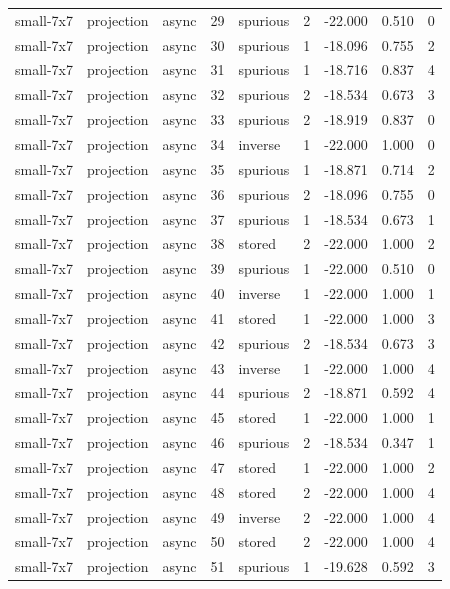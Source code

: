 \begin{tabular}{lllrlrrrr}
small-7x7 & projection & async & 29 & spurious & 2 & -22.000 & 0.510 & 0 \\
small-7x7 & projection & async & 30 & spurious & 1 & -18.096 & 0.755 & 2 \\
small-7x7 & projection & async & 31 & spurious & 1 & -18.716 & 0.837 & 4 \\
small-7x7 & projection & async & 32 & spurious & 2 & -18.534 & 0.673 & 3 \\
small-7x7 & projection & async & 33 & spurious & 2 & -18.919 & 0.837 & 0 \\
small-7x7 & projection & async & 34 & inverse & 1 & -22.000 & 1.000 & 0 \\
small-7x7 & projection & async & 35 & spurious & 1 & -18.871 & 0.714 & 2 \\
small-7x7 & projection & async & 36 & spurious & 2 & -18.096 & 0.755 & 0 \\
small-7x7 & projection & async & 37 & spurious & 1 & -18.534 & 0.673 & 1 \\
small-7x7 & projection & async & 38 & stored & 2 & -22.000 & 1.000 & 2 \\
small-7x7 & projection & async & 39 & spurious & 1 & -22.000 & 0.510 & 0 \\
small-7x7 & projection & async & 40 & inverse & 1 & -22.000 & 1.000 & 1 \\
small-7x7 & projection & async & 41 & stored & 1 & -22.000 & 1.000 & 3 \\
small-7x7 & projection & async & 42 & spurious & 2 & -18.534 & 0.673 & 3 \\
small-7x7 & projection & async & 43 & inverse & 1 & -22.000 & 1.000 & 4 \\
small-7x7 & projection & async & 44 & spurious & 2 & -18.871 & 0.592 & 4 \\
small-7x7 & projection & async & 45 & stored & 1 & -22.000 & 1.000 & 1 \\
small-7x7 & projection & async & 46 & spurious & 2 & -18.534 & 0.347 & 1 \\
small-7x7 & projection & async & 47 & stored & 1 & -22.000 & 1.000 & 2 \\
small-7x7 & projection & async & 48 & stored & 2 & -22.000 & 1.000 & 4 \\
small-7x7 & projection & async & 49 & inverse & 2 & -22.000 & 1.000 & 4 \\
small-7x7 & projection & async & 50 & stored & 2 & -22.000 & 1.000 & 4 \\
small-7x7 & projection & async & 51 & spurious & 1 & -19.628 & 0.592 & 3 \\

\end{tabular}
